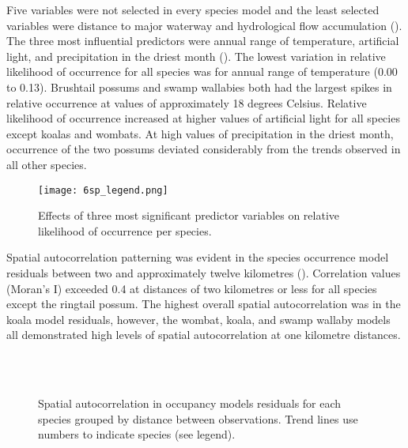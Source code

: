 Five variables were not selected in every species model and the least selected variables were distance to major waterway and hydrological flow accumulation (). The three most influential predictors were annual range of temperature, artificial light, and precipitation in the driest month (). The lowest variation in relative likelihood of occurrence for all species was for annual range of temperature (0.00 to 0.13). Brushtail possums and swamp wallabies both had the largest spikes in relative occurrence at values of approximately 18 degrees Celsius. Relative likelihood of occurrence increased at higher values of artificial light for all species except koalas and wombats. At high values of precipitation in the driest month, occurrence of the two possums deviated considerably from the trends observed in all other species. 

\begin{figure*}[!t]
  \centering
  \texttt{[image: 6sp\_legend.png]}\\
  \caption[Most significant predictor variables on relative likelihood of occurrence for six mammal species]{Effects of three most significant predictor variables on relative likelihood of occurrence per species.}
  \label{6sp_term_occ}
\end{figure*}

Spatial autocorrelation patterning was evident in the species occurrence model residuals between two and approximately twelve kilometres (). Correlation values (Moran's I) exceeded 0.4 at distances of two kilometres or less for all species except the ringtail possum. The highest overall spatial autocorrelation was in the koala model residuals, however, the wombat, koala, and swamp wallaby models all demonstrated high levels of spatial autocorrelation at one kilometre distances.

\begin{figure*}[!t]
  \centering
  \\
  \\
  \caption[Spatial autocorrelation in occupancy models residuals for six mammal species]{Spatial autocorrelation in occupancy models residuals for each species grouped by distance between observations. Trend lines use numbers to indicate species (see legend).}
  \label{6sp_sac}
\end{figure*}

